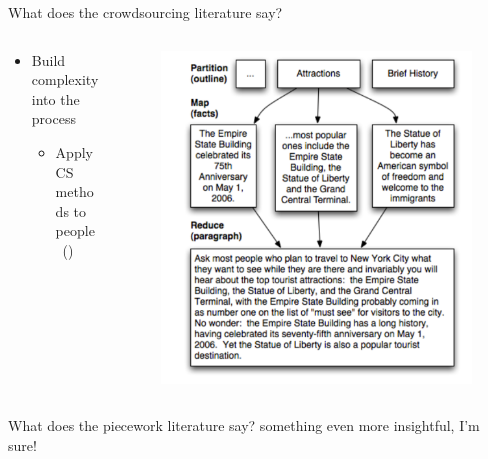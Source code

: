 \documentclass{beamer}
\begin{document}
\begin{frame}{What does the crowdsourcing literature say?}
\begin{columns}[t]

  \begin{column}[t]{0.5\textwidth}
    \begin{itemize}
      \item Build complexity into the process
      \begin{itemize}
        \item Apply CS methods to people~(\textcite{crowdForgeKittur})
      \end{itemize}
    \end{itemize}
  \end{column}
  
  \begin{column}{0.5\textwidth}
    \begin{figure}
    \includegraphics[width=\textwidth]{figures/mapReduce.png}
    \end{figure}
  \end{column}
  
\end{columns}
\end{frame}

\begin{frame}{What does the piecework literature say?}
    something even more insightful, I'm sure!
\end{frame}
\end{document}
